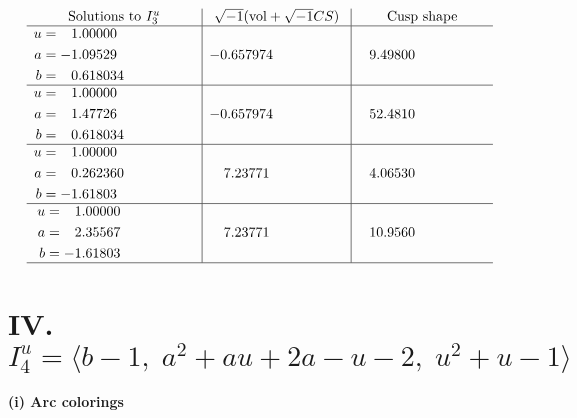 \documentclass[1p]{elsarticle_modified}
\theoremstyle{definition}
\newcommand{\I}{\sqrt{-1}}
\begin{document}
$$\begin{array}{c|c|c}  
\text{Solutions to }I^u_{3}& \I (\text{vol} + \sqrt{-1}CS) & \text{Cusp shape}\\
 \hline 
\begin{aligned}
u &= \phantom{-}1.00000\phantom{ +0.000000I} \\
a &= -1.09529\phantom{ +0.000000I} \\
b &= \phantom{-}0.618034\phantom{ +0.000000I}\end{aligned}
 & -0.657974\phantom{ +0.000000I} & \phantom{-}9.49800\phantom{ +0.000000I} \\ \hline\begin{aligned}
u &= \phantom{-}1.00000\phantom{ +0.000000I} \\
a &= \phantom{-}1.47726\phantom{ +0.000000I} \\
b &= \phantom{-}0.618034\phantom{ +0.000000I}\end{aligned}
 & -0.657974\phantom{ +0.000000I} & \phantom{-}52.4810\phantom{ +0.000000I} \\ \hline\begin{aligned}
u &= \phantom{-}1.00000\phantom{ +0.000000I} \\
a &= \phantom{-}0.262360\phantom{ +0.000000I} \\
b &= -1.61803\phantom{ +0.000000I}\end{aligned}
 & \phantom{-}7.23771\phantom{ +0.000000I} & \phantom{-}4.06530\phantom{ +0.000000I} \\ \hline\begin{aligned}
u &= \phantom{-}1.00000\phantom{ +0.000000I} \\
a &= \phantom{-}2.35567\phantom{ +0.000000I} \\
b &= -1.61803\phantom{ +0.000000I}\end{aligned}
 & \phantom{-}7.23771\phantom{ +0.000000I} & \phantom{-}10.9560\phantom{ +0.000000I}\\
 \hline 
 \end{array}$$\newpage\newpage\renewcommand{\arraystretch}{1}
\centering \section*{IV. $I^u_{4}= \langle b-1,\;a^2+a u+2 a- u-2,\;u^2+u-1 \rangle$}
\flushleft \textbf{(i) Arc colorings}\\
\end{document}
